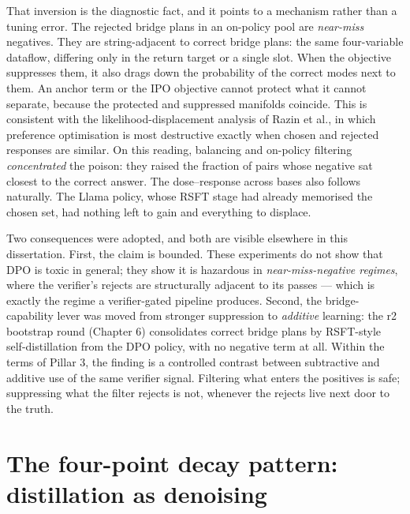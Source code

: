 \documentclass[10pt]{article} %
\begin{document}
That inversion is the diagnostic fact, and it points to a mechanism rather than a tuning error. The rejected bridge plans in an on-policy pool are \emph{near-miss} negatives. They are string-adjacent to correct bridge plans: the same four-variable dataflow, differing only in the return target or a single slot. When the objective suppresses them, it also drags down the probability of the correct modes next to them. An anchor term or the IPO objective cannot protect what it cannot separate, because the protected and suppressed manifolds coincide. This is consistent with the likelihood-displacement analysis of Razin et al., in which preference optimisation is most destructive exactly when chosen and rejected responses are similar. On this reading, balancing and on-policy filtering \emph{concentrated} the poison: they raised the fraction of pairs whose negative sat closest to the correct answer. The dose--response across bases also follows naturally. The Llama policy, whose RSFT stage had already memorised the chosen set, had nothing left to gain and everything to displace.

Two consequences were adopted, and both are visible elsewhere in this dissertation. First, the claim is bounded. These experiments do not show that DPO is toxic in general; they show it is hazardous in \emph{near-miss-negative regimes}, where the verifier's rejects are structurally adjacent to its passes --- which is exactly the regime a verifier-gated pipeline produces. Second, the bridge-capability lever was moved from stronger suppression to \emph{additive} learning: the r2 bootstrap round (Chapter 6) consolidates correct bridge plans by RSFT-style self-distillation from the DPO policy, with no negative term at all. Within the terms of Pillar 3, the finding is a controlled contrast between subtractive and additive use of the same verifier signal. Filtering what enters the positives is safe; suppressing what the filter rejects is not, whenever the rejects live next door to the truth.

\section{The four-point decay pattern: distillation as denoising}\label{sec:the-four-point-decay-pattern-distillatio}
\end{document}
